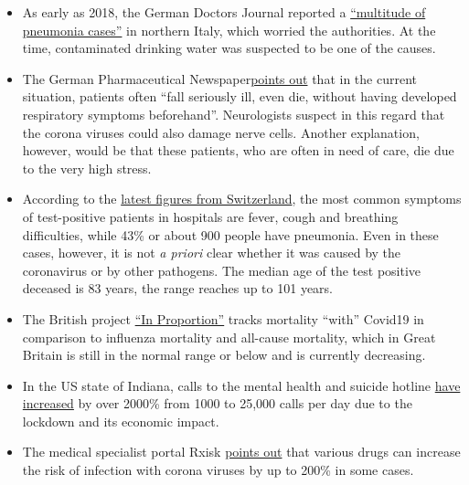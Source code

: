 \begin{itemize}
\item
  As early as 2018, the German Doctors Journal reported a
  \href{https://www.aerzteblatt.de/nachrichten/97750/Vielzahl-an-Lungenentzuendungen-beunruhigen-Behoerden-in-Norditalien}{``multitude
  of pneumonia cases''} in northern Italy, which worried the
  authorities. At the time, contaminated drinking water was suspected to
  be one of the causes.
\item
  The German Pharmaceutical
  Newspaper\href{https://www.pharmazeutische-zeitung.de/atemstillstand-koennte-auch-zentrale-ursache-haben-116664/}{points
  out} that in the current situation, patients often ``fall seriously
  ill, even die, without having developed respiratory symptoms
  beforehand''. Neurologists suspect in this regard that the corona
  viruses could also damage nerve cells. Another explanation, however,
  would be that these patients, who are often in need of care, die due
  to the very high stress.
\item
  According to the
  \href{https://www.bag.admin.ch/dam/bag/de/dokumente/mt/k-und-i/aktuelle-ausbrueche-pandemien/2019-nCoV/covid-19-lagebericht.pdf.download.pdf/COVID-19_Epidemiologische_Lage_Schweiz.pdf}{latest
  figures from Switzerland}, the most common symptoms of test-positive
  patients in hospitals are fever, cough and breathing difficulties,
  while 43\% or about 900 people have pneumonia. Even in these cases,
  however, it is not \emph{a priori} clear whether it was caused by the
  coronavirus or by other pathogens. The median age of the test positive
  deceased is 83 years, the range reaches up to 101 years.
\item
  The British project \href{http://inproportion2.talkigy.com/}{``In
  Proportion''} tracks mortality ``with'' Covid19 in comparison to
  influenza mortality and all-cause mortality, which in Great Britain is
  still in the normal range or below and is currently decreasing.
\item
  In the US state of Indiana, calls to the mental health and suicide
  hotline
  \href{https://twitter.com/JesseKellyDC/status/1246449878219145216}{have
  increased} by over 2000\% from 1000 to 25,000 calls per day due to the
  lockdown and its economic impact.
\item
  The medical specialist portal Rxisk
  \href{https://rxisk.org/medications-compromising-covid-infections/}{points
  out} that various drugs can increase the risk of infection with corona
  viruses by up to 200\% in some cases.
\end{itemize}

